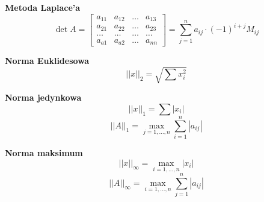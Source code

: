 \documentclass[../mn-notatki.tex]{subfiles}
\begin{document}
\begin{tcolorbox}
\textbf{Metoda Laplace'a}
\[
\det A =
\begin{bmatrix}
a_{11} & a_{12} & \ldots &a_{13}\\
a_{21} & a_{22} & \ldots &a_{23}\\
\ldots & \ldots & \ldots &\ldots\\
a_{a1} & a_{a2} & \ldots &a_{nn}
\end{bmatrix}
=
\sum_{j=1}^{n} a_{ij} \cdot (-1)^{i+j} M_{ij}
\]
\end{tcolorbox}

\begin{tcolorbox}
\textbf{Norma Euklidesowa}
\[
||x||_2 = \sqrt{\sum x_i^2}
\]
\end{tcolorbox}

\begin{tcolorbox}
\textbf{Norma jedynkowa}
\[
||x||_1 = \sum |x_i|
\]
\[
||A||_1 = \max_{j = 1, \ldots, n} \sum_{i = 1}^{n} |a_{ij}|
\]
\end{tcolorbox}

\begin{tcolorbox}
\textbf{Norma maksimum}
\[
||x||_\infty = \max_{i = 1, \ldots, n} |x_i|
\]
\[
||A||_\infty = \max_{i = 1, \ldots, n} \sum_{j = 1}^{n} |a_{ij}|
\]
\end{tcolorbox}

\pagebreak
\end{document}
